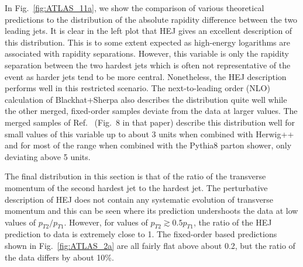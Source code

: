 			In Fig.~\ref{fig:ATLAS_11a}, we show the comparison of various theoretical
			predictions to the distribution of the absolute rapidity difference between the
			two leading jets.  It is clear in the left plot that HEJ gives an excellent
			description of this distribution.  This is to some extent expected as
			high-energy logarithms are associated with rapidity separations.  However, this
			variable is only the rapidity separation between the two hardest jets which is
			often not representative of the event as harder jets tend to be more central.
			Nonetheless, the HEJ description performs well in this restricted scenario.  The
			next-to-leading order (NLO) calculation of Blackhat+Sherpa also describes the
			distribution quite well while the other merged, fixed-order samples deviate from
			the data at larger values.  The merged samples of Ref.~\cite{Frederix:2015eii}
			(Fig.~8 in that paper) describe this distribution well for small values of this
			variable up to about 3 units when combined with Herwig++ and for most of the
			range when combined with the Pythia8 parton shower, only deviating above 5 units.

			The final distribution in this section is that of the ratio of the transverse
			momentum of the second hardest jet to the hardest jet.  The perturbative
			description of HEJ does not contain any systematic evolution of transverse
			momentum and this can be seen where its prediction undershoots the data at low
			values of $p_{T2}/p_{T1}$.  However, for values of $p_{T2} \gtrsim 0.5 p_{T1}$,
			the ratio of the HEJ prediction to data is extremely close to 1.  The
			fixed-order based predictions shown in Fig.~\ref{fig:ATLAS_2a} are all fairly
			flat above about 0.2, but the ratio of the data differs by about 10\%.

			\newpage

